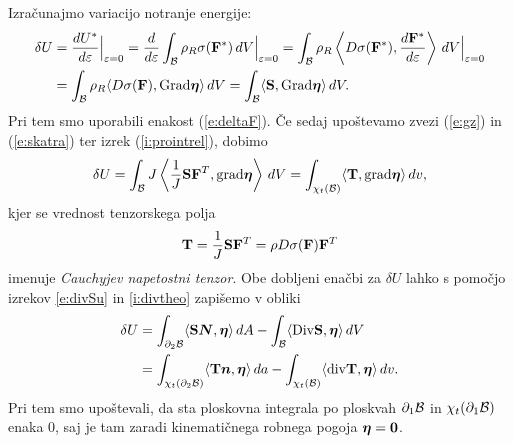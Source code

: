 Izračunajmo variacijo notranje energije:
\begin{align*} 
	\delta U &=\frac{dU^*}{d\varepsilon}\Big|_{\varepsilon=0}=\frac{d}{d\varepsilon}
	\int_{\mathcal B}\rho_R \sigma(\mathbf F^*)\,dV \Big|_{\varepsilon=0} =
	\int_{\mathcal B}\rho_R \left< D\sigma(\mathbf F^*),\frac{d\mathbf F^*}{d\varepsilon}\right>\,dV \Big|_{\varepsilon=0} \\
	&= \int_{\mathcal B}\rho_R \langle D\sigma(\mathbf F),\mathrm{Grad}\boldsymbol \eta\rangle\,dV
	=\int_{\mathcal B}\langle\mathbf S,\mathrm{Grad}\boldsymbol \eta\rangle\,dV.
\end{align*}
Pri tem smo uporabili enakost (\ref{e:deltaF}). Če sedaj upoštevamo zvezi (\ref{e:gz}) in
(\ref{e:skatra}) ter izrek (\ref{i:prointrel}), dobimo
\begin{align*} 
	\delta U = \int_{\mathcal B}J\left<\frac{1}{J}\mathbf S\mathbf F^{T},\mathrm{grad}\boldsymbol \eta\right>\,dV =
	\int_{\chi_t(\mathcal B)}\langle\mathbf T,\mathrm{grad}\boldsymbol \eta\rangle\,dv,
\end{align*}
kjer se vrednost tenzorskega polja
\begin{equation} \label{e:napetostni}
	\mathbf T=\frac{1}{J}\mathbf S\mathbf F^{T}=\rho D\sigma(\mathbf F)\mathbf F^{T}
\end{equation}
imenuje \emph{Cauchyjev napetostni tenzor}. Obe dobljeni enačbi za $\delta U$ lahko
s pomočjo izrekov \ref{e:divSu} in \ref{i:divtheo} zapišemo v obliki
\begin{align}
	\delta U &= \int_{\partial_2\mathcal B}\langle\mathbf S\boldsymbol N,\boldsymbol \eta\rangle\,dA-
	\int_{\mathcal B}\langle\mathrm {Div}\mathbf S,\boldsymbol \eta\rangle\,dV \label{e:vapoesr} \\
	&= \int_{\chi_t(\partial_2\mathcal B)}\langle\mathbf T\boldsymbol n,\boldsymbol \eta\rangle\,da-
	\int_{\chi_t(\mathcal B)}\langle\mathrm{div}\mathbf T,\boldsymbol \eta\rangle\,dv. \label{e:vapoesp}
\end{align}
Pri tem smo upoštevali, da sta ploskovna integrala po ploskvah $\partial_1\mathcal B$ in
$\chi_t(\partial_1\mathcal B)$ enaka 0, saj je tam zaradi kinematičnega robnega pogoja $\boldsymbol \eta=\boldsymbol 0$.

